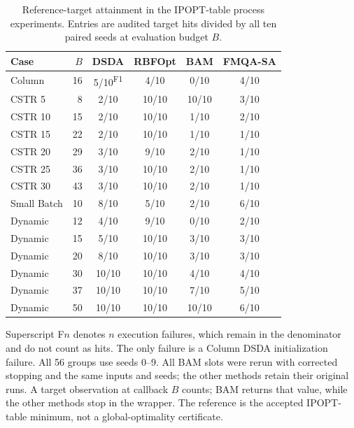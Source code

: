 \documentclass{article}
\begin{document}
\begin{table}[htbp]
\centering
\caption{Reference-target attainment in the IPOPT-table process experiments. Entries are audited target hits divided by all ten paired seeds at evaluation budget $B$.}
\label{tab:process-targets}
\small
\begin{tabular}{@{}lrcccc@{}}
\toprule
Case & $B$ & DSDA & RBFOpt & BAM & FMQA-SA \\
\midrule
Column & 16 & 5/10\textsuperscript{F1} & 4/10 & 0/10 & 4/10 \\
CSTR 5 & 8 & 2/10 & 10/10 & 10/10 & 3/10 \\
CSTR 10 & 15 & 2/10 & 10/10 & 1/10 & 2/10 \\
CSTR 15 & 22 & 2/10 & 10/10 & 1/10 & 1/10 \\
CSTR 20 & 29 & 3/10 & 9/10 & 2/10 & 1/10 \\
CSTR 25 & 36 & 3/10 & 10/10 & 2/10 & 1/10 \\
CSTR 30 & 43 & 3/10 & 10/10 & 2/10 & 1/10 \\
Small Batch & 10 & 8/10 & 5/10 & 2/10 & 6/10 \\
Dynamic & 12 & 4/10 & 9/10 & 0/10 & 2/10 \\
Dynamic & 15 & 5/10 & 10/10 & 3/10 & 3/10 \\
Dynamic & 20 & 8/10 & 10/10 & 3/10 & 3/10 \\
Dynamic & 30 & 10/10 & 10/10 & 4/10 & 4/10 \\
Dynamic & 37 & 10/10 & 10/10 & 7/10 & 5/10 \\
Dynamic & 50 & 10/10 & 10/10 & 10/10 & 6/10 \\
\bottomrule
\end{tabular}
\par\vspace{3pt}
\begin{minipage}{0.96\linewidth}
\footnotesize Superscript F$n$ denotes $n$ execution failures, which remain in the denominator and do not count as hits. The only failure is a Column DSDA initialization failure. All 56 groups use seeds 0--9. All BAM slots were rerun with corrected stopping and the same inputs and seeds; the other methods retain their original runs. A target observation at callback $B$ counts; BAM returns that value, while the other methods stop in the wrapper. The reference is the accepted IPOPT-table minimum, not a global-optimality certificate.
\end{minipage}
\end{table}
\end{document}
